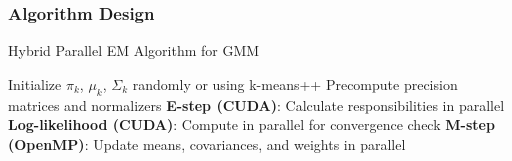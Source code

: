 \documentclass{beamer}
\begin{document}
\begin{frame}
    \frametitle{Algorithm Design}
    \begin{algorithm}[H]
    \caption{Hybrid Parallel EM Algorithm for GMM}
    \begin{algorithmic}[1]
    \State Initialize $\pi_k$, $\mu_k$, $\Sigma_k$ randomly or using k-means++
    \State Precompute precision matrices and normalizers
    \Repeat
        \State \textbf{E-step (CUDA)}: Calculate responsibilities in parallel
        \State \textbf{Log-likelihood (CUDA)}: Compute in parallel for convergence check
        \State \textbf{M-step (OpenMP)}: 
        \State \quad Update means, covariances, and weights in parallel
    \end{algorithmic}
    \end{algorithm}
\end{frame}
\end{document}
